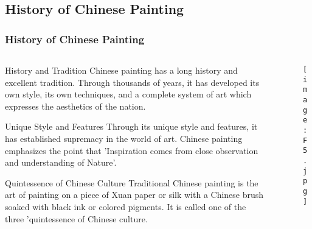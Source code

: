 \documentclass[pdflatex,compress,8pt,
	xcolor={dvipsnames,dvipsnames,svgnames,x11names,table},
	hyperref={	
	breaklinks = true, 
	pdfauthor={Lemenkova Polina}, 
	pdfsubject={Preentation}, 
	pdfcreator={Lemenkova Polina}, 
	pdfproducer={Lemenkova Polina}, 
	colorlinks=true,
	linkcolor=NavyBlue, 
	citecolor=NavyBlue, 
	urlcolor = NavyBlue, 
	breaklinks = true}]{beamer}
\begin{document}
\subsection{History of Chinese Painting}
\begin{frame}\frametitle{History of Chinese Painting}

	\begin{minipage}[0.4\textheight]{\textwidth}
		\begin{columns}[T]
			\begin{column}{0.5\textwidth}
		\small{
		\begin{alertblock}{History and Tradition}
Chinese painting has a long history and excellent tradition. Through thousands of years, it has developed its own style, its own techniques, and a complete system of art which expresses the aesthetics of the nation.
		\end{alertblock}

		\begin{block}{Unique Style and Features}
Through its unique style and features, it has established supremacy in the world of art. Chinese painting emphasizes the point that 'Inspiration comes from close observation and understanding of Nature'.
		\end{block}

		\begin{alertblock}{Quintessence of Chinese Culture}
Traditional Chinese painting is the art of painting on a piece of Xuan paper or silk with a Chinese brush soaked with black ink or colored pigments. It is called one of the three 'quintessence of Chinese culture.
		\end{alertblock}
		}
			\end{column}
			\begin{column}{0.5\textwidth}
\begin{figure}[H]
	\centering
		\texttt{[image: F5.jpg]}
\end{figure}
			\end{column}
		\end{columns}
	\end{minipage}
	
\end{frame}
\end{document}
